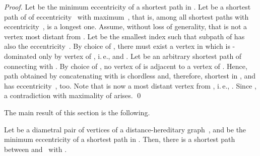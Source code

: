 \documentclass[10pt]{llncs}
\makeatletter
\newcommand{\ie}{i.\,e.\@ifnextchar{,}{}{~}}
\makeatother
\begin{document}
\begin{proof} 
Let  be the minimum eccentricity of a shortest path in . 
Let  be a shortest path of  of eccentricity~ with maximum~, that is, among all shortest paths with eccentricity~,  is a longest one. 
Assume, without loss of generality, that  is not a vertex most distant from . 
Let  be the smallest index such that subpath  of  has also the eccentricity~. 
By choice of , there must exist a vertex  in  which is -dominated only by vertex  of , \ie,  and . 
Let  be an arbitrary shortest path of  connecting  with .
By choice of , no vertex of  is adjacent to a vertex of . 
Hence, path obtained by concatenating  with  is chordless and, therefore, shortest in , and has eccentricity~, too. 
Note that  is now a most distant vertex from , \ie, . 
Since , a contradiction with maximality of  arises. 
\qed
\end{proof}

The main result of this section is the following.

\begin{theorem}
    \label{th:dhg} 
Let  be a diametral pair of vertices of a distance-hereditary graph~, and  be the minimum eccentricity of a shortest path in . 
Then, there is a shortest path~ between  and~ with .  
\end{theorem}
\end{document}
